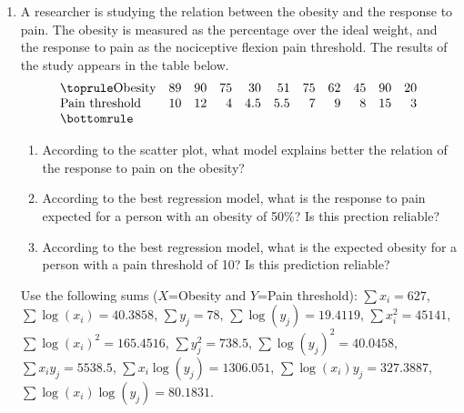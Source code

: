 \begin{enumerate}[leftmargin=*,resume]
\item A researcher is studying the relation between the obesity and the response to pain. 
The obesity is measured as the percentage over the ideal weight, and the response to pain as the nociceptive flexion pain threshold.
The results of the study appears in the table below.
\[
\begin{array}{lrrrrrrrrrr}
\toprule
\mbox{Obesity} & 89 & 90 & 75 & 30 & 51 & 75 & 62 & 45 & 90 & 20\\
\mbox{Pain threshold} & 10 & 12 & 4 & 4.5 & 5.5 & 7 & 9 & 8 & 15 & 3\\
\bottomrule
\end{array}
\]
\begin{enumerate}
\item According to the scatter plot, what model explains better the relation of the response to pain on the
obesity?
\item According to the best regression model, what is the response to pain expected for a person with an obesity of
50\%? Is this prection reliable?
\item According to the best regression model, what is the expected obesity for a person with a pain threshold of
10? Is this prediction reliable?
\end{enumerate}
Use the following sums ($X$=Obesity and $Y$=Pain threshold): $\sum x_i=627$, $\sum \log(x_i)=40.3858$, $\sum y_j=78$,
$\sum \log(y_j)=19.4119$, $\sum x_i^2=45141$, $\sum \log(x_i)^2=165.4516$, $\sum y_j^2=738.5$, $\sum
\log(y_j)^2=40.0458$, $\sum x_iy_j=5538.5$, $\sum x_i\log(y_j)=1306.051$, $\sum \log(x_i)y_j=327.3887$, $\sum
\log(x_i)\log(y_j)=80.1831$.

\end{enumerate}

